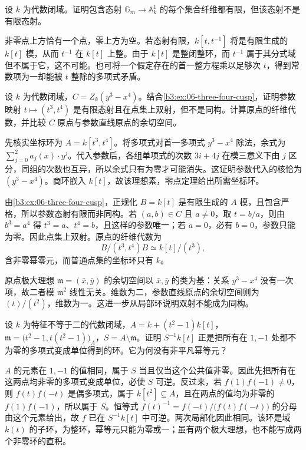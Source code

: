 \begin{exercise}\label{b3:ex:07-finite-fibers-not-finite}
	设 \(k\) 为代数闭域。证明包含态射 \(\mathbb G_m\to\mathbb A_k^1\) 的每个集合纤维都有限，但该态射不是有限态射。
\end{exercise}
\begin{solution}
	非零点上方恰有一个点，零上方为空。若态射有限，\(k[t,t^{-1}]\) 将是有限生成的 \(k[t]\) 模，从而 \(t^{-1}\) 在 \(k[t]\) 上整。由于 \(k[t]\) 是整闭整环，而 \(t^{-1}\) 属于其分式域但不属于它，这不可能。也可将一个假定存在的首一整方程乘以足够次 \(t\)，得到常数项为一却能被 \(t\) 整除的多项式矛盾。
\end{solution}

\begin{exercise}\label{b3:ex:07-monomial-curve-conductor}
	设 \(k\) 为代数闭域，\(C=Z_k(y^3-x^4)\)。结合\cref{b3:ex:06-three-four-cusp}，证明参数映射 \(t\mapsto(t^3,t^4)\) 是有限态射且在点集上双射，但不是同构。计算原点的纤维代数，并比较 \(C\) 原点与参数直线原点的余切空间。
\end{exercise}
\begin{solution}
	先核实坐标环为 \(A=k[t^3,t^4]\)。将多项式对首一多项式 \(y^3-x^4\) 除法，余式为 \(\sum_{j=0}^2 a_j(x)\cdot y^j\)。代入参数后，各组单项式的次数 \(3i+4j\) 在模三意义下由 \(j\) 区分，同组的次数也互异，所以余式只有为零才可能消失。这证明参数代入的核恰为 \((y^3-x^4)\)。商环嵌入 \(k[t]\)，故该理想素，零点定理给出所需坐标环。

	由\cref{b3:ex:06-three-four-cusp}，正规化 \(B=k[t]\) 是有限生成的 \(A\) 模，且包含严格，所以参数态射有限而非同构。若 \((a,b)\in C\) 且 \(a\ne0\)，取 \(t=b/a\)，则由 \(b^3=a^4\) 得 \(t^3=a\)、\(t^4=b\)，且这样的参数唯一；若 \(a=0\)，必有 \(b=0\)，参数只能为零。因此点集上双射。原点的纤维代数为
	\[
		B/(t^3,t^4)B\simeq k[t]/(t^3),
	\]
	含非零幂零元，而普通点集的坐标环只有 \(k\)。

	原点极大理想 \(\mathfrak m=(\bar x,\bar y)\) 的余切空间以 \(\bar x,\bar y\) 的类为基：关系 \(y^3-x^4\) 没有一次项，故二者模 \(\mathfrak m^2\) 线性无关。维数为二，参数直线原点的余切空间则为 \((t)/(t^2)\)，维数为一。这进一步从局部环说明双射不能成为同构。
\end{solution}

\begin{exercise}\label{b3:ex:07-node-semilocal-units}
	设 \(k\) 为特征不等于二的代数闭域，\(A=k+(t^2-1)k[t]\)，\(\mathfrak m=\bigl(t^2-1,t(t^2-1)\bigr)_A\)，\(S=A\setminus\mathfrak m\)。证明 \(S^{-1}k[t]\) 正是把所有在 \(1,-1\) 处都不为零的多项式变成单位得到的环。它为何没有非平凡幂等元？
\end{exercise}
\begin{solution}
	\(A\) 的元素在 \(1,-1\) 的值相同，属于 \(S\) 当且仅当这个公共值非零。因此先把所有在这两点均非零的多项式变成单位，必使 \(S\) 可逆。反过来，若 \(f(1)f(-1)\ne0\)，则 \(f(t)f(-t)\) 是偶多项式，属于 \(k[t^2]\subseteq A\)，且在两点的值均为非零的 \(f(1)f(-1)\)，所以属于 \(S\)。恒等式 \(f(t)^{-1}=f(-t)/\bigl(f(t)f(-t)\bigr)\) 的分母由这个元素给出，故 \(f\) 已在 \(S^{-1}k[t]\) 中可逆。两次局部化因此相同。该环是域 \(k(t)\) 的子环，为整环，幂等元只能为零或一；虽有两个极大理想，也不能写成两个非零环的直积。
\end{solution}

